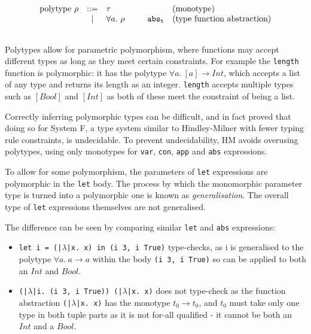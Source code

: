\documentclass[a4paper,fleqn,oneside,12pt]{report}
\begin{document}
$$\begin{array}{lcllll}
  \\
    \textrm{polytype}\ \rho & ::= & \tau            & \hspace{0.25cm} & & \textrm{(monotype)}\\
                          & \vert & \forall a.\ \rho &                 & \mathtt{abs_t} & \textrm{(type function abstraction)}\\
  \\
\end{array}
$$

Polytypes allow for parametric polymorphism, where functions may accept different types as long as they meet certain constraints. For example the \texttt{length} function is polymorphic: it has the polytype $\forall a.\ [a] \rightarrow Int$, which accepts a list of any type and returns its length as an integer. \texttt{length} accepts multiple types such as $[Bool]$ and $[Int]$ as both of these meet the constraint of being a list.

Correctly inferring polymorphic types can be difficult, and in fact \cite{ref14} proved that doing so for System F, a type system similar to Hindley-Milner with fewer typing rule constraints, is undecidable. To prevent undecidability, HM avoids overusing polytypes, using only monotypes for \texttt{var}, \texttt{con}, \texttt{app} and \texttt{abs} expressions.

To allow for some polymorphism, the parameters of \texttt{let} expressions are polymorphic in the \texttt{let} body. The process by which the monomorphic parameter type is turned into a polymorphic one is known as \textit{generalisation}. The overall type of \texttt{let} expressions themselves are not generalised.

The difference can be seen by comparing similar \texttt{let} and \texttt{abs} expressions:
\begin{itemize}
  \item \texttt{let i = (|$\lambda$|x. x) in (i 3, i True)} type-checks, as i is generalised to the polytype $\forall a.\ a \rightarrow a$ within the body \texttt{(i 3, i True)} so can be applied to both an $Int$ and $Bool$.
  \item \texttt{(|$\lambda$|i. (i 3, i True)) (|$\lambda$|x. x)} does not type-check as the function abstraction \texttt{(|$\lambda$|x. x)} has the monotype $t_0 \rightarrow t_0$, and $t_0$ must take only one type in both tuple parts as it is not for-all qualified - it cannot be both an $Int$ and a $Bool$.
\end{itemize}
\end{document}
